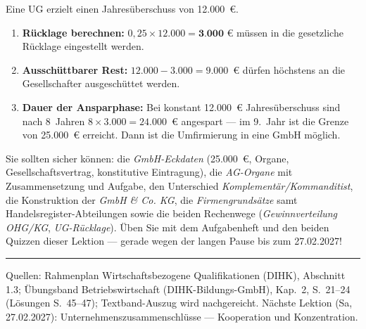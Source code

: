 \documentclass[11pt, a4paper]{article}
\begin{document}
\begin{beispiel}[title={\bfseries Zahlenbeispiel: UG-Rücklage}]
Eine UG erzielt einen Jahresüberschuss von 12.000~€.
\begin{enumerate}
  \item \textbf{Rücklage berechnen:} $0{,}25 \times 12.000 = \textbf{3.000~€}$
    müssen in die gesetzliche Rücklage eingestellt werden.
  \item \textbf{Ausschüttbarer Rest:} $12.000 - 3.000 = 9.000$~€ dürfen höchstens
    an die Gesellschafter ausgeschüttet werden.
  \item \textbf{Dauer der Ansparphase:} Bei konstant 12.000~€ Jahresüberschuss sind
    nach 8~Jahren $8 \times 3.000 = 24.000$~€ angespart --- im 9.~Jahr ist die Grenze
    von 25.000~€ erreicht. Dann ist die Umfirmierung in eine GmbH möglich.
\end{enumerate}
\end{beispiel}

\begin{merksatz}[title={\bfseries Wichtig für die Prüfungsvorbereitung (Teil 2)}]
Sie sollten sicher können: die \emph{GmbH-Eckdaten} (25.000~€, Organe,
Gesellschaftsvertrag, konstitutive Eintragung), die \emph{AG-Organe} mit Zusammensetzung
und Aufgabe, den Unterschied \emph{Komplementär/Kommanditist}, die Konstruktion der
\emph{GmbH \& Co. KG}, die \emph{Firmengrundsätze} samt Handelsregister-Abteilungen
sowie die beiden Rechenwege (\emph{Gewinnverteilung OHG/KG}, \emph{UG-Rücklage}).
Üben Sie mit dem Aufgabenheft und den beiden Quizzen dieser Lektion ---
gerade wegen der langen Pause bis zum 27.02.2027!
\end{merksatz}

\vspace{1em}
\hrule
\vspace{0.8em}
\noindent\textsf{\small Quellen: Rahmenplan Wirtschaftsbezogene Qualifikationen (DIHK), Abschnitt 1.3;
Übungsband Betriebswirtschaft (DIHK-Bildungs-GmbH), Kap.~2, S.~21--24 (Lösungen S.~45--47);
Textband-Auszug wird nachgereicht. Nächste Lektion (Sa, 27.02.2027): Unternehmenszusammenschlüsse ---
Kooperation und Konzentration.}
\end{document}
